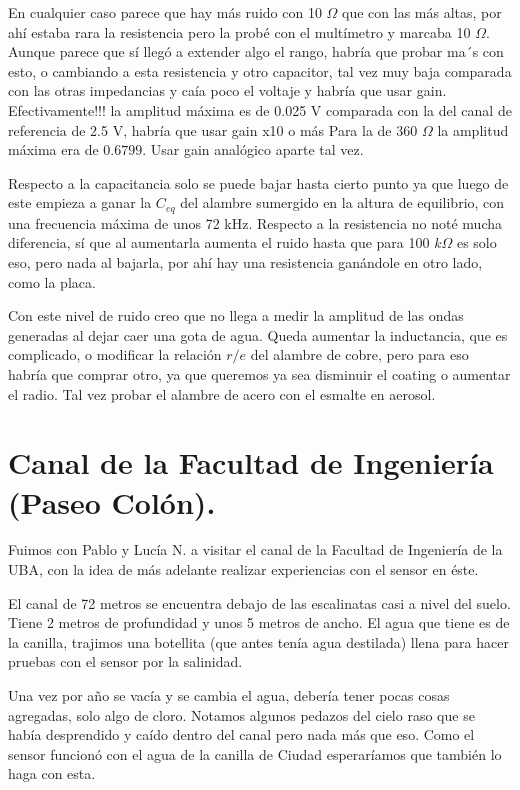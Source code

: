 En cualquier caso parece que hay más ruido con 10 $\Omega$ que con las más altas, por ahí estaba rara la resistencia pero la probé con el multímetro y marcaba 10 $\Omega$. Aunque parece que sí llegó a extender algo el rango, habría que probar ma´s con esto, o cambiando a esta resistencia y otro capacitor, tal vez muy baja comparada con las otras impedancias y caía poco el voltaje y habría que usar gain. Efectivamente!!! la amplitud máxima es de 0.025 V comparada con la del canal de referencia de 2.5 V, habría que usar gain x10 o más Para la de $360$ $\Omega$ la amplitud máxima era de $0.6799$.  Usar gain analógico aparte tal vez.

Respecto a la capacitancia solo se puede bajar hasta cierto punto ya que luego de este empieza a ganar la $C_{eq}$ del alambre sumergido en la altura de equilibrio, con una frecuencia máxima de unos 72 kHz. Respecto a la resistencia no noté mucha diferencia, sí que al aumentarla aumenta el ruido hasta que para 100 $k\Omega$ es solo eso, pero nada al bajarla, por ahí hay una resistencia ganándole en otro lado, como la placa. 

Con este nivel de ruido creo que no llega a medir la amplitud de las ondas generadas al dejar caer una gota de agua. Queda aumentar la inductancia, que es complicado, o modificar la relación $r/e$ del alambre de cobre, pero para eso habría que comprar otro, ya que queremos ya sea disminuir el coating o aumentar el radio. Tal vez probar el alambre de acero con el esmalte en aerosol. %

\section{Canal de la Facultad de Ingeniería (Paseo Colón).}
Fuimos con Pablo y Lucía N. a visitar el canal de la Facultad de Ingeniería de la UBA, con la idea de más adelante realizar experiencias con el sensor en éste. 

El canal de 72 metros se encuentra debajo de las escalinatas casi a nivel del suelo. Tiene 2 metros de profundidad y unos 5 metros de ancho. El agua que tiene es de la canilla, trajimos una botellita (que antes tenía agua destilada) llena para hacer pruebas con el sensor por la salinidad. 

Una vez por año se vacía y se cambia el agua, debería tener pocas cosas agregadas, solo algo de cloro. Notamos algunos pedazos del cielo raso que se había desprendido y caído dentro del canal pero nada más que eso. Como el sensor funcionó con el agua de la canilla de Ciudad esperaríamos que también lo haga con esta. 

